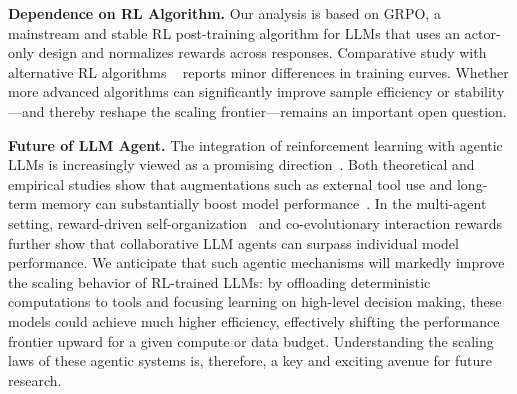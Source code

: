 \textbf{Dependence on RL Algorithm.}
Our analysis is based on GRPO, a mainstream and stable RL post-training algorithm for LLMs that uses an actor-only design and normalizes rewards across responses. Comparative study with alternative RL algorithms ~\citep{cui2025entropymechanismreinforcementlearning} reports minor differences in training curves. Whether more advanced algorithms can significantly improve sample efficiency or stability—and thereby reshape the scaling frontier—remains an important open question.

\textbf{Future of LLM Agent.}
The integration of reinforcement learning with agentic LLMs is increasingly viewed as a promising direction~\citep{zhang2025landscapeagenticreinforcementlearning, zhang2025surveyreinforcementlearninglarge}. Both theoretical and empirical studies show that augmentations such as external tool use and long-term memory can substantially boost model performance~\citep{lin2025understandingtoolintegratedreasoning,houliston2025provablebenefitsintoollearning,mai2025agentrlscalinglaw}. In the multi-agent setting, reward-driven self-organization~\citep{zhou2025reso} and co-evolutionary interaction rewards~\citep{xue2026comascoevolvingmultiagentsystems} further show that collaborative LLM agents can surpass individual model performance. We anticipate that such agentic mechanisms will markedly improve the scaling behavior of RL-trained LLMs: by offloading deterministic computations to tools and focusing learning on high-level decision making, these models could achieve much higher efficiency, effectively shifting the performance frontier upward for a given compute or data budget. Understanding the scaling laws of these agentic systems is, therefore, a key and exciting avenue for future research.
